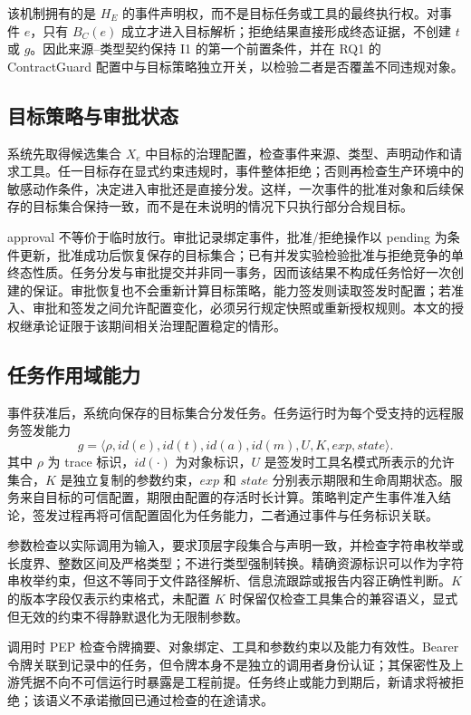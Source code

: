 该机制拥有的是 $H_E$ 的事件声明权，而不是目标任务或工具的最终执行权。对事件 $e$，只有 $B_C(e)$ 成立才进入目标解析；拒绝结果直接形成终态证据，不创建 $t$ 或 $g$。因此来源--类型契约保持 I1 的第一个前置条件，并在 RQ1 的 ContractGuard 配置中与目标策略独立开关，以检验二者是否覆盖不同违规对象。

\subsection{目标策略与审批状态}

系统先取得候选集合 $X_e$ 中目标的治理配置，检查事件来源、类型、声明动作和请求工具。任一目标存在显式约束违规时，事件整体拒绝；否则再检查生产环境中的敏感动作条件，决定进入审批还是直接分发。这样，一次事件的批准对象和后续保存的目标集合保持一致，而不是在未说明的情况下只执行部分合规目标。

approval 不等价于临时放行。审批记录绑定事件，批准/拒绝操作以 pending 为条件更新，批准成功后恢复保存的目标集合；已有并发实验检验批准与拒绝竞争的单终态性质。任务分发与审批提交并非同一事务，因而该结果不构成任务恰好一次创建的保证。审批恢复也不会重新计算目标策略，能力签发则读取签发时配置；若准入、审批和签发之间允许配置变化，必须另行规定快照或重新授权规则。本文的授权继承论证限于该期间相关治理配置稳定的情形。

\subsection{任务作用域能力}

事件获准后，系统向保存的目标集合分发任务。任务运行时为每个受支持的远程服务签发能力
\begin{equation}
g=\langle \rho,id(e),id(t),id(a),id(m),U,K,exp,state\rangle .
\label{eq:grant-v11}
\end{equation}
其中 $\rho$ 为 trace 标识，$id(\cdot)$ 为对象标识，$U$ 是签发时工具名模式所表示的允许集合，$K$ 是独立复制的参数约束，$exp$ 和 $state$ 分别表示期限和生命周期状态。服务来自目标的可信配置，期限由配置的存活时长计算。策略判定产生事件准入结论，签发过程再将可信配置固化为任务能力，二者通过事件与任务标识关联。

参数检查以实际调用为输入，要求顶层字段集合与声明一致，并检查字符串枚举或长度界、整数区间及严格类型；不进行类型强制转换。精确资源标识可以作为字符串枚举约束，但这不等同于文件路径解析、信息流跟踪或报告内容正确性判断。$K$ 的版本字段仅表示约束格式，未配置 $K$ 时保留仅检查工具集合的兼容语义，显式但无效的约束不得静默退化为无限制参数。

调用时 PEP 检查令牌摘要、对象绑定、工具和参数约束以及能力有效性。Bearer 令牌关联到记录中的任务，但令牌本身不是独立的调用者身份认证；其保密性及上游凭据不向不可信运行时暴露是工程前提。任务终止或能力到期后，新请求将被拒绝；该语义不承诺撤回已通过检查的在途请求。

